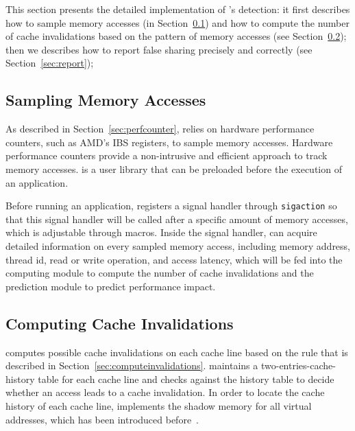 \label{sec:implement}
This section presents the detailed implementation of \Cheetah{}'s detection: it first describes how to sample memory accesses (in Section~\ref{sec:detect-trace}) and how to compute the number of cache invalidations based on the pattern of memory accesses (see Section~\ref{sec:compute}); then we describes how to report false sharing precisely and correctly (see Section~\ref{sec:report});


\subsection{Sampling Memory Accesses}
\label{sec:detect-trace}

As described in Section~\ref{sec:perfcounter}, \Cheetah{} relies on hardware performance counters, such as AMD's IBS registers, to sample memory accesses. Hardware performance counters provide a non-intrusive and efficient approach to track memory accesses. \Cheetah{} is a user library that can be preloaded before the execution of an application. 

Before running an application, \Cheetah{}  registers a signal handler through \texttt{sigaction} so that this signal handler will be called after a specific amount of memory accesses, which is adjustable through macros. Inside the signal handler, \Cheetah{} can acquire detailed information on every sampled memory access, including memory address, thread id, read or write operation, and access latency, which will be fed into the computing module to compute the number of cache invalidations and the prediction module to predict performance impact. 


\subsection{Computing Cache Invalidations}
\label{sec:compute}

\Cheetah{} computes possible cache invalidations on each cache line based on the rule that is described in Section~\ref{sec:computeinvalidations}. \Cheetah{} maintains a two-entries-cache-history table for each cache line and checks against the history table to decide whether an access leads to a cache invalidation. In order to locate the cache history of each cache line, \Cheetah{} implements the shadow memory for all virtual addresses, which has been introduced before~\cite{qinzhao}. 

